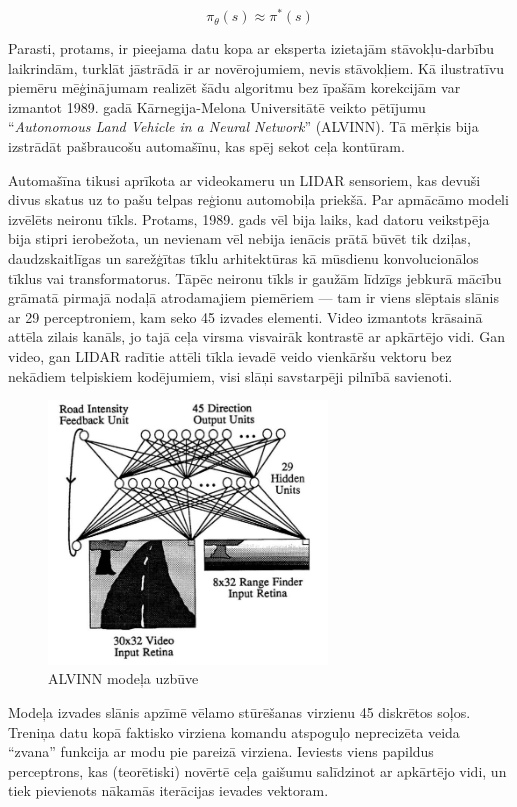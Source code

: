 \documentclass[12pt, a4paper]{article}
\numberwithin{equation}{section} %
\begin{document}
\begin{equation}
    \pi_{\theta}(s) \approx \pi^*(s)
\end{equation}

Parasti, protams, ir pieejama datu kopa ar eksperta izietajām stāvokļu-darbību laikrindām, turklāt jāstrādā ir ar novērojumiem, nevis stāvokļiem. Kā ilustratīvu piemēru mēģinājumam realizēt šādu algoritmu bez īpašām korekcijām var izmantot 1989. gadā Kārnegija-Melona Universitātē veikto pētījumu ``\textit{Autonomous Land Vehicle in a Neural Network}'' (ALVINN)\cite{pomerleau1989alvinn}. Tā mērķis bija izstrādāt pašbraucošu automašīnu, kas spēj sekot ceļa kontūram.

Automašīna tikusi aprīkota ar videokameru un LIDAR sensoriem, kas devuši divus skatus uz to pašu telpas reģionu automobiļa priekšā. Par apmācāmo modeli izvēlēts neironu tīkls. Protams, 1989. gads vēl bija laiks, kad datoru veikstpēja bija stipri ierobežota, un nevienam vēl nebija ienācis prātā būvēt tik dziļas, daudzskaitlīgas un sarežģītas tīklu arhitektūras kā mūsdienu konvolucionālos tīklus vai transformatorus. Tāpēc neironu tīkls ir gaužām līdzīgs jebkurā mācību grāmatā pirmajā nodaļā atrodamajiem piemēriem --- tam ir viens slēptais slānis ar 29 perceptroniem, kam seko 45 izvades elementi. Video izmantots krāsainā attēla zilais kanāls, jo tajā ceļa virsma visvairāk kontrastē ar apkārtējo vidi. Gan video, gan LIDAR radītie attēli tīkla ievadē veido vienkāršu vektoru bez nekādiem telpiskiem kodējumiem, visi slāņi savstarpēji pilnībā savienoti.

\begin{figure}[h!]
    \centering
    \includegraphics[height=7cm,page=1]{../img/alvinn_architecture.png}
    \caption{ALVINN modeļa uzbūve\cite{pomerleau1989alvinn}}
\end{figure}

Modeļa izvades slānis apzīmē vēlamo stūrēšanas virzienu 45 diskrētos soļos. Treniņa datu kopā faktisko virziena komandu atspoguļo neprecizēta veida ``zvana'' funkcija ar modu pie pareizā virziena. Ieviests viens papildus perceptrons, kas (teorētiski) novērtē ceļa gaišumu salīdzinot ar apkārtējo vidi, un tiek pievienots nākamās iterācijas ievades vektoram.
\end{document}
